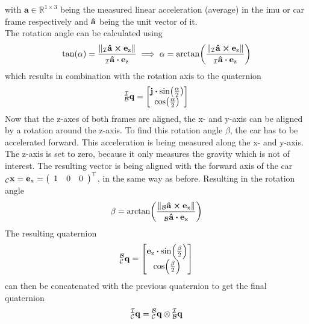 with $\mathbf{a} \in \mathbb{R}^{1\times3}$ being the measured linear acceleration (average) in the \acrshort{imu} or car frame respectively and $\vu{a}$ being the unit vector of it.\\
The rotation angle can be calculated using
\begin{equation}
    \tan(\alpha) = \frac{\norm{\vincs{\vu{a}}{i} \cp \vb{e}_\mathrm{z}}}{\vincs{\vu{a}}{i} \vdot \vb{e}_\mathrm{z}} \implies
    \alpha = \arctan(\frac{\norm{\vincs{\vu{a}}{i} \cp \vb{e}_\mathrm{z}}}{\vincs{\vu{a}}{i} \vdot \vb{e}_\mathrm{z}})
\end{equation}
which results in combination with the rotation axis to the quaternion
\begin{equation}
    \qtf{i}{b} =
    \begin{bmatrix}
        \vb{j}\vdot\sin(\frac{\alpha}{2}) \\
        \cos(\frac{\alpha}{2})
    \end{bmatrix}
\end{equation}
Now that the z-axes of both frames are aligned, the x- and y-axis can be aligned by a rotation around the z-axis.
To find this rotation angle $\beta$, the car has to be accelerated forward.
This acceleration is being measured along the x- and y-axis.
The z-axis is set to zero, because it only measures the gravity which is not of interest.
The resulting vector is being aligned with the forward axis of the car $\vincs{x}{c} = \mathbf{e}_\mathrm{x} = \left(\begin{array}{lll} 1 & 0 & 0 \end{array}\right)^{\top}$, in the same way as before.
Resulting in the rotation angle
\begin{equation}
    \beta = \arctan(\frac{\norm{\vincs{\vu{a}}{b} \cp \vb{e}_\mathrm{x}}}{\vincs{\vu{a}}{b} \vdot \vb{e}_\mathrm{x}})
\end{equation}
The resulting quaternion
\begin{equation}
    \qtf{b}{c} =
    \begin{bmatrix}
        \vb{e}_\mathrm{z}\vdot\sin(\frac{\beta}{2}) \\
        \cos(\frac{\beta}{2})
    \end{bmatrix}
\end{equation}
can then be concatenated with the previous quaternion to get the final quaternion
\begin{equation}
    \qtf{i}{c} = \qtf{b}{c} \otimes  \qtf{i}{b}
\end{equation}
